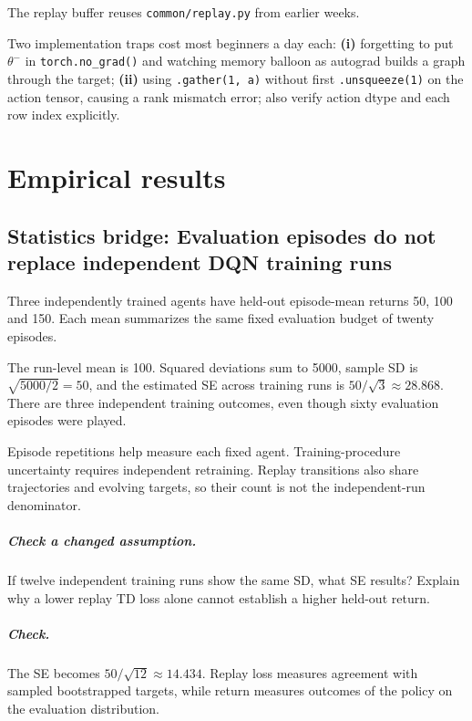 \documentclass[11pt,oneside]{scrbook}
\begin{document}
The replay buffer reuses \texttt{common/replay.py} from earlier weeks.

\begin{pitfall}
Two implementation traps cost most beginners a day each:
\textbf{(i)} forgetting to put $\theta^-$ in \texttt{torch.no\_grad()} and watching memory
balloon as autograd builds a graph through the target;
\textbf{(ii)} using \texttt{.gather(1, a)} without first \texttt{.unsqueeze(1)} on the
action tensor, causing a rank mismatch error; also verify action dtype and each row
index explicitly.
\end{pitfall}

\chapter{Empirical results}

\section{Statistics bridge: Evaluation episodes do not replace independent DQN training runs}
\begin{example}
Three independently trained agents have held-out episode-mean returns 50, 100 and 150. Each mean summarizes the same fixed evaluation budget of twenty episodes.

The run-level mean is 100. Squared deviations sum to 5000, sample SD is $\sqrt{5000/2}=50$, and the estimated SE across training runs is $50/\sqrt3\approx28.868$. There are three independent training outcomes, even though sixty evaluation episodes were played.
\end{example}
Episode repetitions help measure each fixed agent. Training-procedure uncertainty requires independent retraining. Replay transitions also share trajectories and evolving targets, so their count is not the independent-run denominator.

\paragraph{Check a changed assumption.} If twelve independent training runs show the same SD, what SE results? Explain why a lower replay TD loss alone cannot establish a higher held-out return.
\paragraph{Check.} The SE becomes $50/\sqrt{12}\approx14.434$. Replay loss measures agreement with sampled bootstrapped targets, while return measures outcomes of the policy on the evaluation distribution.
\end{document}
